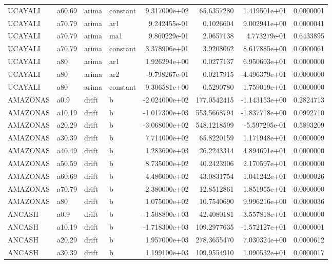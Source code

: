 \documentclass[
]{article}
\begin{document}
\begin{table}[!h]
\begin{tabular}[t]{llllrrrr}
UCAYALI & a60.69 & arima & constant & 9.317000e+02 & 65.6357280 & 1.419501e+01 & 0.0000001\\
UCAYALI & a70.79 & arima & ar1 & 9.242455e-01 & 0.1026604 & 9.002941e+00 & 0.0000041\\
UCAYALI & a70.79 & arima & ma1 & 9.860229e-01 & 2.0657138 & 4.773279e-01 & 0.6433895\\
\addlinespace
UCAYALI & a70.79 & arima & constant & 3.378906e+01 & 3.9208062 & 8.617885e+00 & 0.0000061\\
UCAYALI & a80 & arima & ar1 & 1.926294e+00 & 0.0277137 & 6.950693e+01 & 0.0000000\\
UCAYALI & a80 & arima & ar2 & -9.798267e-01 & 0.0217915 & -4.496379e+01 & 0.0000000\\
UCAYALI & a80 & arima & constant & 9.306581e+00 & 0.5290780 & 1.759019e+01 & 0.0000000\\
AMAZONAS & a0.9 & drift & b & -2.024000e+02 & 177.0542415 & -1.143153e+00 & 0.2824713\\
\addlinespace
AMAZONAS & a10.19 & drift & b & -1.017300e+03 & 553.5668794 & -1.837718e+00 & 0.0992710\\
AMAZONAS & a20.29 & drift & b & -3.068000e+02 & 548.1218599 & -5.597295e-01 & 0.5893209\\
AMAZONAS & a30.39 & drift & b & 7.714000e+02 & 65.8220159 & 1.171948e+01 & 0.0000009\\
AMAZONAS & a40.49 & drift & b & 1.283600e+03 & 26.2243314 & 4.894691e+01 & 0.0000000\\
AMAZONAS & a50.59 & drift & b & 8.735000e+02 & 40.2423906 & 2.170597e+01 & 0.0000000\\
\addlinespace
AMAZONAS & a60.69 & drift & b & 4.486000e+02 & 43.0831754 & 1.041242e+01 & 0.0000026\\
AMAZONAS & a70.79 & drift & b & 2.380000e+02 & 12.8512861 & 1.851955e+01 & 0.0000000\\
AMAZONAS & a80 & drift & b & 1.075000e+02 & 10.7540690 & 9.996216e+00 & 0.0000036\\
ANCASH & a0.9 & drift & b & -1.508800e+03 & 42.4080181 & -3.557818e+01 & 0.0000000\\
ANCASH & a10.19 & drift & b & -1.718300e+03 & 109.2977635 & -1.572127e+01 & 0.0000001\\
\addlinespace
ANCASH & a20.29 & drift & b & 1.957000e+03 & 278.3655470 & 7.030324e+00 & 0.0000612\\
ANCASH & a30.39 & drift & b & 1.199100e+03 & 109.9554910 & 1.090532e+01 & 0.0000017\\

\end{tabular}
\end{table}
\end{document}
